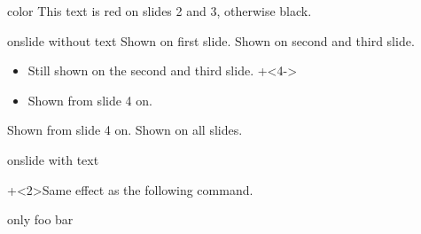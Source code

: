 \documentclass{beamer}
\begin{document}
%

\begin{frame}{color}
 This text is red on slides 2 and 3, otherwise black.
\end{frame}


\begin{frame}{onslide without text}
  Shown on first slide.
  Shown on second and third slide.
  \begin{itemize}
  \item
    Still shown on the second and third slide.
  \onslide+<4->
  \item
    Shown from slide 4 on.
  \end{itemize}
  Shown from slide 4 on.
  \onslide
  Shown on all slides.
\end{frame}

\begin{frame}{onslide with text}

  \onslide+<2>{Same effect as the following command.}

\end{frame}

%

\begin{frame}{only}
foo
bar
\end{frame}
\end{document}
